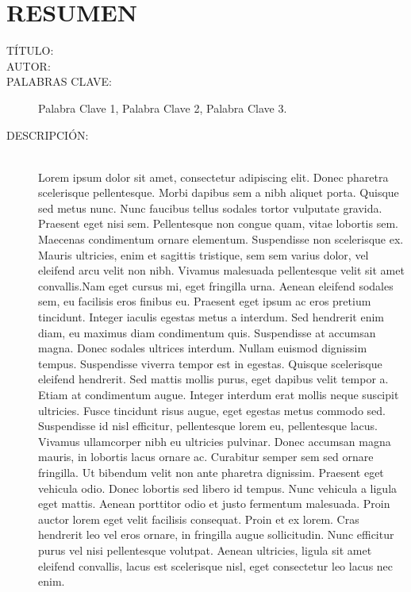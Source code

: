 \chapter*{RESUMEN}

\footnotesize{
\begin{description}
  \item[TÍTULO:] \MakeUppercase{\titulo}
  \item[AUTOR:]\MakeUppercase{\autor} 
  \item[PALABRAS CLAVE:] Palabra Clave 1, Palabra Clave 2, Palabra Clave 3.
  \item[DESCRIPCIÓN:]\hfill \\ 
Lorem ipsum dolor sit amet, consectetur adipiscing elit. Donec pharetra scelerisque pellentesque. Morbi dapibus sem a nibh aliquet porta. Quisque sed metus nunc. Nunc faucibus tellus sodales tortor vulputate gravida. Praesent eget nisi sem. Pellentesque non congue quam, vitae lobortis sem. Maecenas condimentum ornare elementum. Suspendisse non scelerisque ex. Mauris ultricies, enim et sagittis tristique, sem sem varius dolor, vel eleifend arcu velit non nibh. Vivamus malesuada pellentesque velit sit amet convallis.Nam eget cursus mi, eget fringilla urna. Aenean eleifend sodales sem, eu facilisis eros finibus eu. Praesent eget ipsum ac eros pretium tincidunt. Integer iaculis egestas metus a interdum. Sed hendrerit enim diam, eu maximus diam condimentum quis. Suspendisse at accumsan magna. Donec sodales ultrices interdum. Nullam euismod dignissim tempus. Suspendisse viverra tempor est in egestas. Quisque scelerisque eleifend hendrerit. Sed mattis mollis purus, eget dapibus velit tempor a. Etiam at condimentum augue. Integer interdum erat mollis neque suscipit ultricies. Fusce tincidunt risus augue, eget egestas metus commodo sed. Suspendisse id nisl efficitur, pellentesque lorem eu, pellentesque lacus. Vivamus ullamcorper nibh eu ultricies pulvinar. Donec accumsan magna mauris, in lobortis lacus ornare ac. Curabitur semper sem sed ornare fringilla. Ut bibendum velit non ante pharetra dignissim. Praesent eget vehicula odio. Donec lobortis sed libero id tempus. Nunc vehicula a ligula eget mattis. Aenean porttitor odio et justo fermentum malesuada. Proin auctor lorem eget velit facilisis consequat. Proin et ex lorem. Cras hendrerit leo vel eros ornare, in fringilla augue sollicitudin. Nunc efficitur purus vel nisi pellentesque volutpat. Aenean ultricies, ligula sit amet eleifend convallis, lacus est scelerisque nisl, eget consectetur leo lacus nec enim.
\end{description}}\normalsize

